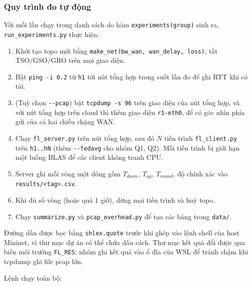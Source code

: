 \subsubsection{Quy trình đo tự động}
Với mỗi lần chạy trong danh sách do hàm \texttt{experiments(group)} sinh ra, \texttt{run\_experiments.py} thực hiện:
\begin{enumerate}
    \item Khởi tạo topo mới bằng \texttt{make\_net(bw\_wan, wan\_delay, loss)}, tắt TSO/GSO/GRO trên mọi giao diện.
    \item Bật \texttt{ping -i 0.2} từ \texttt{h1} tới nút tổng hợp trong suốt lần đo để ghi RTT khi có tải.
    \item (Tuỳ chọn \texttt{-{}-pcap}) bật \texttt{tcpdump -s 96} trên giao diện của nút tổng hợp, và với nút tổng hợp trên cloud thì thêm giao diện \texttt{r1-eth0}, để có góc nhìn phía gửi của cả hai chiều chặng WAN.
    \item Chạy \texttt{fl\_server.py} trên nút tổng hợp, sau đó $N$ tiến trình \texttt{fl\_client.py} trên \texttt{h1..hN} (thêm \texttt{-{}-fedavg} cho nhóm Q1, Q2). Mỗi tiến trình bị giới hạn một luồng BLAS để các client không tranh CPU.
    \item Server ghi mỗi vòng một dòng gồm $T_{down}$, $T_{up}$, $T_{round}$, độ chính xác vào \texttt{results/<tag>.csv}.
    \item Khi đủ số vòng (hoặc quá 1 giờ), dừng mọi tiến trình và huỷ topo.
    \item Chạy \texttt{summarize.py} và \texttt{pcap\_overhead.py} để tạo các bảng trong \texttt{data/}.
\end{enumerate}
Đường dẫn được bọc bằng \texttt{shlex.quote} trước khi ghép vào lệnh shell của host Mininet, vì thư mục dự án có thể chứa dấu cách. Thư mục kết quả đổi được qua biến môi trường \texttt{FL\_RES}; nhóm ghi kết quả vào ổ đĩa của WSL để tránh chậm khi tcpdump ghi file pcap lớn.

Lệnh chạy toàn bộ:

